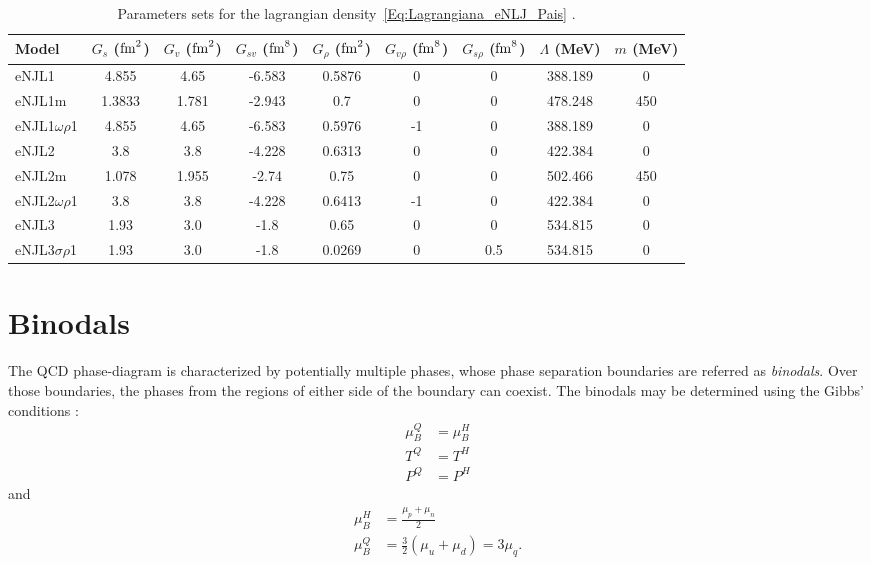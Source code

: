 \documentclass{ws-ijmpcs}
\begin{document}
\begin{table}
\centering
\caption{Parameters sets for the lagrangian density~\eqref{Eq:Lagrangiana_eNLJ_Pais} \cite{Pais2016}. \label{Tab:Parametros_eNJL}}
\begin{tabular}{lcccccccc}
\toprule
Model & $G_s$ ($\rm{fm}^2$) & $G_v$ ($\rm{fm}^2$) & $G_{sv}$ ($\rm{fm}^8$) & $G_\rho$ ($\rm{fm}^2$) & $G_{v\rho}$ ($\rm{fm}^8$) & $G_{s\rho}$ ($\rm{fm}^8$) & $\Lambda$ (MeV) & $m$ (MeV) \\
\midrule
eNJL1 & 4.855 & 4.65 & -6.583 & 0.5876 & 0 & 0 & 388.189 & 0 \\
eNJL1m & 1.3833 & 1.781 & -2.943 & 0.7 & 0 & 0 & 478.248 & 450 \\
eNJL1$\omega\rho$1 & 4.855 & 4.65 & -6.583 & 0.5976 & -1 & 0 & 388.189 & 0 \\
eNJL2 & 3.8 & 3.8 & -4.228 & 0.6313 & 0 & 0 & 422.384 & 0 \\
eNJL2m & 1.078 & 1.955 & -2.74 & 0.75 & 0 & 0 & 502.466 & 450 \\
eNJL2$\omega\rho$1 & 3.8 & 3.8 & -4.228 & 0.6413 & -1 & 0 & 422.384 & 0 \\
eNJL3 & 1.93 & 3.0 & -1.8 & 0.65 & 0 & 0 & 534.815 & 0 \\
eNJL3$\sigma\rho$1 & 1.93 & 3.0 & -1.8 & 0.0269 & 0 & 0.5 & 534.815 & 0 \\
\bottomrule
\end{tabular}
\end{table}

\columnbreak

\section{Binodals}

The QCD phase-diagram is characterized by potentially multiple phases, whose phase separation boundaries are referred as \emph{binodals}. Over those boundaries, the phases from the regions of either side of the boundary can coexist. The binodals may be determined using the Gibbs' conditions \cite{Cavagnoli2011}:
\begin{align}
\mu_B^Q &= \mu_B^H\\
T^Q &= T^H \\
P^Q &= P^H
\end{align}
%
and
\begin{align}
	\mu_B^H &= \frac{\mu_p + \mu_n}{2} \\
	\mu_B^Q &= \frac{3}{2} (\mu_u + \mu_d) = 3 \mu_q.
\end{align}
\end{document}
